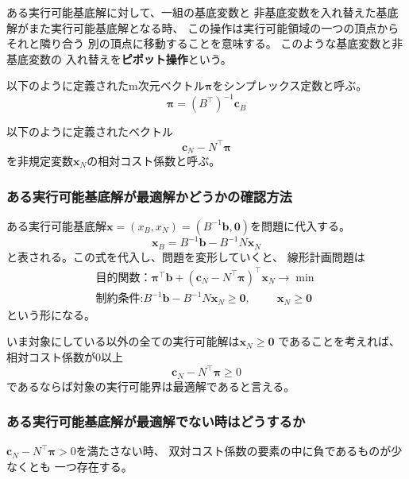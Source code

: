 \documentclass[9pt]{ltjsreport}
\begin{document}
\begin{tcolorbox}[title=ピポット操作]
ある実行可能基底解に対して、一組の基底変数と
非基底変数を入れ替えた基底解がまた実行可能基底解となる時、
この操作は実行可能領域の一つの頂点からそれと隣り合う
別の頂点に移動することを意味する。
このような基底変数と非基底変数の
入れ替えを\textbf{ピポット操作}という。
\end{tcolorbox}
\begin{tcolorbox}[title=シンプレックス乗数、双対コスト係数]
    以下のように定義されたm次元ベクトル$\bm{\pi}$をシンプレックス定数と呼ぶ。
    \begin{equation}
        \bm{\pi}=(B^\top)^{-1}\bm{c}_B
    \end{equation}

    以下のように定義されたベクトル
    \begin{equation}
    \bm{c}_N-N^\top\bm{\pi}
    \end{equation}
    を非規定変数$\bm{x}_N$の相対コスト係数と呼ぶ。
\end{tcolorbox}

\subsubsection{ある実行可能基底解が最適解かどうかの確認方法}
ある実行可能基底解$\bm{x}=(x_{B},x_{N})=(B^{-1}\bm{b},\bm{0})$を問題に代入する。
\begin{equation}
    \bm{x}_B=B^{-1}\bm{b}-B^{-1}N\bm{x}_N \label{eq:transformedBase}
\end{equation}
と表される。この式を代入し、問題を変形していくと、
線形計画問題は
\begin{gather}
    \text{目的関数：}\bm{\pi}^\top\bm{b}+
    (\bm{c}_N-N^\top\bm{\pi})^\top\bm{x}_N
    \longrightarrow \min\\
    \text{制約条件:}
    B^{-1}\bm{b}-B^{-1}N\bm{x}_N\ge\bm{0},
    \hspace{1cm}\bm{x}_N\ge\bm{0}    
\end{gather}
という形になる。

いま対象にしている以外の全ての実行可能解は$\bm{x}_N\ge\bm{0}$
であることを考えれば、
相対コスト係数が0以上
\begin{equation}
    \bm{c}_N-N^\top\bm{\pi}\ge 0
\end{equation}
であるならば対象の実行可能界は最適解であると言える。

\subsubsection{ある実行可能基底解が最適解でない時はどうするか}
    $\bm{c}_N-N^\top\bm{\pi}>0$を満たさない時、
    双対コスト係数の要素の中に負であるものが少なくとも
    一つ存在する。
\end{document}
